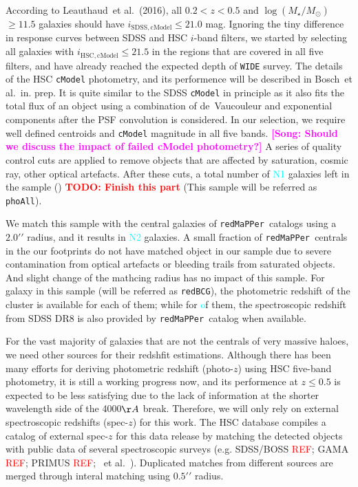 \documentclass[preprint]{aastex}
\def\arcsec{{\prime\prime}}
\def\etal{{\ et al.~}}
\def\redm{\texttt{redMaPPer\ }}
\def\logms{$\log (M_{\star}/M_{\odot})$}
\newcommand{\todo}[1]{\textcolor{red}{\textbf{TODO: #1}}}
\newcommand{\plan}[1]{\textcolor{cyan}{#1}}
\newcommand{\addref}{{\textcolor{red}{REF}}}
\newcommand{\song}[1]{\textcolor{magenta}{\textbf{[Song: #1]}}}
\begin{document}
\begin{CJK*}{UTF8}{gbsn}
    According to Leauthaud\etal (2016), all $0.2 < z < 0.5$ and \logms$\geq 11.5$
    galaxies should have $i_{\mathrm{SDSS, cModel}} \leq 21.0$ mag. 
    Ignoring the tiny difference in response curves between SDSS and HSC 
    $i$-band filters, we started by selecting all galaxies with 
    $i_{\mathrm{HSC, cModel}} \leq 21.5$ in the regions that are covered 
    in all five filters, and have already reached the expected depth of 
    \texttt{WIDE} survey.  
    The details of the HSC \texttt{cModel} photometry, and its performence
    will be described in Bosch\etal in. prep. 
    It is quite similar to the SDSS \texttt{cModel} in principle as it also 
    fits the total flux of an object using a combination of de~Vaucouleur 
    and exponential components after the PSF convolution is considered.  
    In our selection, we require well defined centroids and \texttt{cModel} 
    magnitude in all five bands. 
    \song{Should we discuss the impact of failed cModel photometry?}
    A series of quality control cuts are applied to remove objects that are 
    affected by saturation, cosmic ray, other optical artefacts.  
    After these cuts, a total number of \plan{N1} galaxies left in the 
    sample () \todo{Finish this part}  
    (This sample will be referred as \texttt{phoAll}). 
    
    We match this sample with the central galaxies of \redm catalogs using 
    a $2.0\arcsec$ radius, and it results in \plan{N2} galaxies.  
    A small fraction of \redm centrals in the our footprints do not have 
    matched object in our sample due to severe contamination from optical 
    artefacts or bleeding trails from saturated objects.  
    And slight change of the mathcing radius has no impact of this sample.  
    For galaxy in this sample (will be referred as \texttt{redBCG}), 
    the photometric redshift of the cluster is available for each of them; 
    while for \plan of them, the spectroscopic redshift from SDSS DR8 is 
    also provided by \redm catalog when available.  
    
    For the vast majority of galaxies that are not the centrals of very massive
    haloes, we need other sources for their redshfit estimations. 
    Although there has been many efforts for deriving photometric redshift 
    (photo-$z$) using HSC five-band photometry, it is still a working progress 
    now, and its performence at $z \leq 0.5$ is expected to be less satisfying 
    due to the lack of information at the shorter wavelength side of the 
    4000$\AA$ break.  
    Therefore, we will only rely on external spectroscopic redshifts (spec-$z$)
    for this work.  
    The HSC database compiles a catalog of external spec-$z$ for this data 
    release by matching the detected objects with public data of several 
    spectroscopic surveys (e.g. SDSS/BOSS \addref; GAMA \addref; PRIMUS \addref;
    \etal). 
    Duplicated matches from different sources are merged through interal 
    matching using $0.5\arcsec$ radius.  
    

\end{CJK*}
\end{document}
